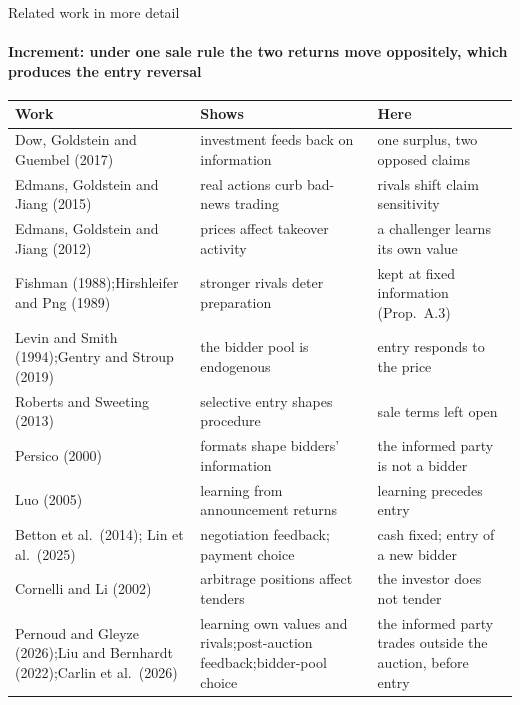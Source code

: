 \documentclass[10pt,aspectratio=169]{beamer}
\newcommand{\NavGap}{\par\vspace{0.45cm}}%
\let\AdapterBackButton\BackButton
\renewcommand{\BackButton}[1]{\NavGap\AdapterBackButton{#1}}%
\begin{document}
\begin{frame}[label=A3]{Related work in more detail}
\framesubtitle{Increment: under one sale rule the two returns move oppositely, which produces the entry reversal}
\hypertarget{app:lit}{}
\vspace{3pt}
{\scriptsize
\setlength{\tabcolsep}{3pt}
\renewcommand{\arraystretch}{1.0}
\begin{tabular}{@{}>{\raggedright\arraybackslash}p{5.1cm}>{\raggedright\arraybackslash}p{4.8cm}>{\raggedright\arraybackslash}p{4.7cm}@{}}
\toprule
Work & Shows & Here\\
\midrule
Dow, Goldstein and Guembel (2017) & investment feeds back on information & one surplus, two opposed claims\\\addlinespace[1pt]
Edmans, Goldstein and Jiang (2015) & real actions curb bad-news trading & rivals shift claim sensitivity\\\addlinespace[1pt]
Edmans, Goldstein and Jiang (2012) & prices affect takeover activity & a challenger learns its own value\\\addlinespace[1pt]
Fishman (1988);\newline Hirshleifer and Png (1989) & stronger rivals deter preparation & kept at fixed information (Prop.~A.3)\\\addlinespace[1pt]
Levin and Smith (1994);\newline Gentry and Stroup (2019) & the bidder pool is endogenous & entry responds to the price\\\addlinespace[1pt]
Roberts and Sweeting (2013) & selective entry shapes procedure & sale terms left open\\\addlinespace[1pt]
Persico (2000) & formats shape bidders' information & the informed party is not a bidder\\\addlinespace[1pt]
Luo (2005) & learning from announcement returns & learning precedes entry\\\addlinespace[1pt]
Betton et al.\ (2014); Lin et al.\ (2025) & negotiation feedback; payment choice & cash fixed; entry of a new bidder\\\addlinespace[1pt]
Cornelli and Li (2002) & arbitrage positions affect tenders & the investor does not tender\\\addlinespace[1pt]
Pernoud and Gleyze (2026);\newline Liu and Bernhardt (2022);\newline Carlin et al.\ (2026) & learning own values and rivals;\newline post-auction feedback;\newline bidder-pool choice & the informed party trades outside the auction, before entry\\
\bottomrule
\end{tabular}\par}
\end{frame}
\end{document}
